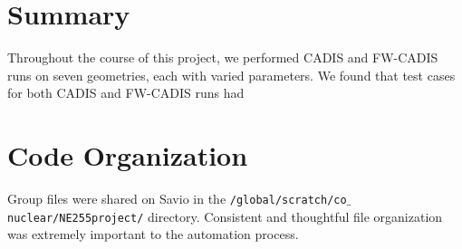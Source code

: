 \documentclass[10pt]{article}
\begin{document}


\section{Summary}

Throughout the course of this project, we performed CADIS and FW-CADIS runs on seven geometries, each with varied parameters. 
We found that test cases for both CADIS and FW-CADIS runs had 

\label{sec:sum}

\printbibliography

\appendix
\section{Code Organization}
\label{app:code-org}

Group files were shared on Savio in the \texttt{/global/scratch/co$\_$nuclear/NE255project/} directory. Consistent and thoughtful file organization was extremely important to the automation process.

\begin{figure}[!ht]

\caption{}
\label{docs:advantg}
\end{figure}

\begin{figure}[!ht]

\caption{}
\label{docs:mcnp}
\end{figure}

\begin{table}

\end{table}
\end{document}

